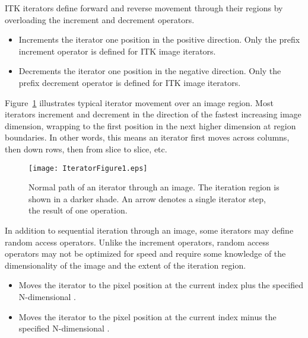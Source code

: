 ITK iterators define forward and reverse movement through their regions by
overloading the increment and decrement operators.

\begin{itemize}
\item \textbf{} Increments the iterator one position in the
positive direction.  Only the prefix increment operator is defined for ITK image
iterators.

\item \textbf{} Decrements the iterator one position in the
negative direction.  Only the prefix decrement operator is defined for ITK
image iterators. 
\end{itemize}

Figure~{\ref{fig:WalkingIterator}} illustrates typical iterator movement over
an image region.  Most iterators increment and decrement in the direction of
the fastest increasing image dimension, wrapping to the first position in the
next higher dimension at region boundaries.  In other words, this means an
iterator first moves across columns, then down rows, then from slice to slice,
etc.

\begin{figure}
\centering
\texttt{[image: IteratorFigure1.eps]}
\caption[ITK image iteration]{Normal path of an iterator through an image.  The
iteration region is shown in a darker shade.  An arrow denotes a single iterator
step, the result of one \code{++} operation.}
\protect\label{fig:WalkingIterator}
\end{figure}

In addition to sequential iteration through an image, some iterators may define
random access operators.  Unlike the increment operators, random access
operators may not be optimized for speed and require some knowledge of the
dimensionality of the image and the extent of the iteration region.  

\begin{itemize}
\item \textbf{} Moves the iterator to the pixel
position at the current index plus the specified N-dimensional . 

\item \textbf{} Moves the iterator to the pixel
position at the current index minus the specified N-dimensional .
\end{itemize}

